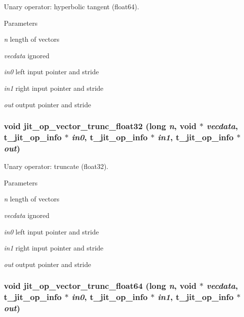 Unary operator: hyperbolic tangent (float64). 
\begin{DoxyParams}{Parameters}
\item[{\em n}]length of vectors \item[{\em vecdata}]ignored \item[{\em in0}]left input pointer and stride \item[{\em in1}]right input pointer and stride \item[{\em out}]output pointer and stride \end{DoxyParams}
\hypertarget{group__opvecmod_ga7b55e59d347017d8ef5169243774a3a2}{
\subsubsection[{jit\_\-op\_\-vector\_\-trunc\_\-float32}]{\setlength{\rightskip}{0pt plus 5cm}void jit\_\-op\_\-vector\_\-trunc\_\-float32 (long {\em n}, \/  void $\ast$ {\em vecdata}, \/  {\bf t\_\-jit\_\-op\_\-info} $\ast$ {\em in0}, \/  {\bf t\_\-jit\_\-op\_\-info} $\ast$ {\em in1}, \/  {\bf t\_\-jit\_\-op\_\-info} $\ast$ {\em out})}}
\label{group__opvecmod_ga7b55e59d347017d8ef5169243774a3a2}


Unary operator: truncate (float32). 
\begin{DoxyParams}{Parameters}
\item[{\em n}]length of vectors \item[{\em vecdata}]ignored \item[{\em in0}]left input pointer and stride \item[{\em in1}]right input pointer and stride \item[{\em out}]output pointer and stride \end{DoxyParams}
\hypertarget{group__opvecmod_gac2f5fb251d5b09fdb1aa28ec6735b27b}{
\subsubsection[{jit\_\-op\_\-vector\_\-trunc\_\-float64}]{\setlength{\rightskip}{0pt plus 5cm}void jit\_\-op\_\-vector\_\-trunc\_\-float64 (long {\em n}, \/  void $\ast$ {\em vecdata}, \/  {\bf t\_\-jit\_\-op\_\-info} $\ast$ {\em in0}, \/  {\bf t\_\-jit\_\-op\_\-info} $\ast$ {\em in1}, \/  {\bf t\_\-jit\_\-op\_\-info} $\ast$ {\em out})}}
\label{group__opvecmod_gac2f5fb251d5b09fdb1aa28ec6735b27b}


